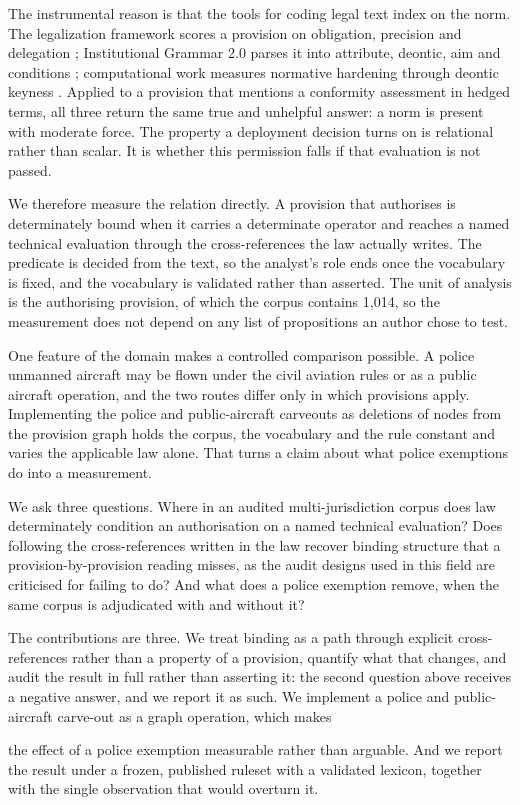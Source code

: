 The instrumental reason is that the tools for coding legal text index on the norm. The legalization framework scores a provision on obligation, precision and delegation \citep{Abbott2000Legalization}; Institutional Grammar 2.0 parses it into attribute, deontic, aim and conditions \citep{FrantzSiddiki2022IG}; computational work measures normative hardening through deontic keyness \citep{Nasirov2026SoftToHard}. Applied to a provision that mentions a conformity assessment in hedged terms, all three return the same true and unhelpful answer: a norm is present with moderate force. The property a deployment decision turns on is relational rather than scalar. It is whether this permission falls if that evaluation is not passed.

We therefore measure the relation directly. A provision that authorises is determinately bound when it carries a determinate operator and reaches a named technical evaluation through the cross-references the law actually writes. The predicate is decided from the text, so the analyst's role ends once the vocabulary is fixed, and the vocabulary is validated rather than asserted. The unit of analysis is the authorising provision, of which the corpus contains 1,014, so the measurement does not depend on any list of propositions an author chose to test.

One feature of the domain makes a controlled comparison possible. A police unmanned aircraft may be flown under the civil aviation rules or as a public aircraft operation, and the two routes differ only in which provisions apply. Implementing the police and public-aircraft carveouts as deletions of nodes from the provision graph holds the corpus, the vocabulary and the rule constant and varies the applicable law alone. That turns a claim about what police exemptions do into a measurement.

We ask three questions. Where in an audited multi-jurisdiction corpus does law determinately condition an authorisation on a named technical evaluation? Does following the cross-references written in the law recover binding structure that a provision-by-provision reading misses, as the audit designs used in this field are criticised for failing to do? And what does a police exemption remove, when the same corpus is adjudicated with and without it?

The contributions are three. We treat binding as a path through explicit cross-references rather than a property of a provision, quantify what that changes, and audit the result in full rather than asserting it: the second question above receives a negative answer, and we report it as such. We implement a police and public-aircraft carve-out as a graph operation, which makes

the effect of a police exemption measurable rather than arguable. And we report the result under a frozen, published ruleset with a validated lexicon, together with the single observation that would overturn it.
